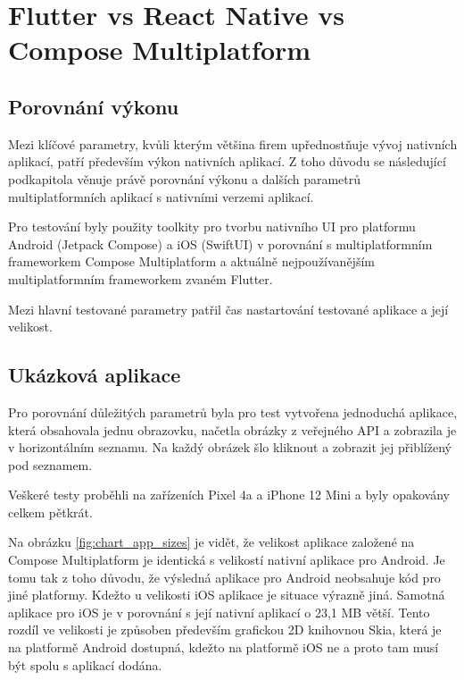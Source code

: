 \section{Flutter vs React Native vs Compose Multiplatform}


\subsection{Porovnání výkonu}

Mezi klíčové parametry, kvůli kterým většina firem upřednostňuje vývoj nativních aplikací, patří především výkon
nativních aplikací. Z toho důvodu se následující podkapitola věnuje právě porovnání výkonu a dalších parametrů multiplatformních aplikací s
nativními verzemi aplikací. 

Pro testování byly použity toolkity pro tvorbu nativního UI pro platformu Android (Jetpack Compose) a iOS (SwiftUI)
v porovnání s multiplatformním frameworkem Compose Multiplatform a aktuálně nejpoužívanějším multiplatformním
frameworkem zvaném Flutter. \cite{crossPlatformFrameworksStats} 

Mezi hlavní testované parametry patřil čas nastartování testované aplikace a její velikost.

\subsection*{Ukázková aplikace}
Pro porovnání důležitých parametrů byla pro test vytvořena jednoduchá aplikace, která obsahovala jednu obrazovku, 
načetla obrázky z veřejného API a zobrazila je v horizontálním seznamu. 
Na každý obrázek šlo kliknout a zobrazit jej přiblížený pod seznamem. 

Veškeré testy proběhli na zařízeních Pixel 4a a iPhone 12 Mini a byly opakovány celkem pětkrát.





Na obrázku \ref{fig:chart_app_sizes} je vidět, že velikost aplikace založené na Compose Multiplatform je identická
s velikostí nativní aplikace pro Android. Je tomu tak z toho důvodu, že výsledná aplikace pro Android neobsahuje kód 
pro jiné platformy. \cite{} Kdežto u velikosti iOS aplikace je situace výrazně jiná. Samotná aplikace pro iOS je v porovnání
s její nativní aplikací o 23,1 MB větší. Tento rozdíl ve velikosti je způsoben především grafickou 2D knihovnou Skia,
která je na platformě Android dostupná, kdežto na platformě iOS ne a proto tam musí být spolu s aplikací dodána. \cite{}

